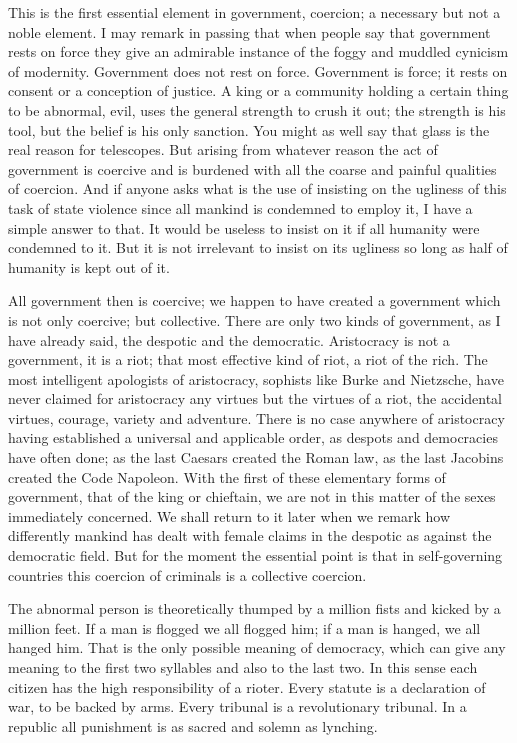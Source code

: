 \documentclass[final,10pt,letterpaper,twocolumn,openany]{book}
\begin{document}
This is the first essential element in government, coercion; a necessary
but not a noble element. I may remark in passing that when people say that
government rests on force they give an admirable instance of the foggy
and muddled cynicism of modernity. Government does not rest on force.
Government is force; it rests on consent or a conception of justice. A king
or a community holding a certain thing to be abnormal, evil, uses the
general strength to crush it out; the strength is his tool, but the belief is his
only sanction. You might as well say that glass is the real reason for
telescopes. But arising from whatever reason the act of government is
coercive and is burdened with all the coarse and painful qualities of
coercion. And if anyone asks what is the use of insisting on the ugliness of
this task of state violence since all mankind is condemned to employ it, I
have a simple answer to that. It would be useless to insist on it if all
humanity were condemned to it. But it is not irrelevant to insist on its
ugliness so long as half of humanity is kept out of it.

All government then is coercive; we happen to have created a
government which is not only coercive; but collective. There are only two
kinds of government, as I have already said, the despotic and the
democratic. Aristocracy is not a government, it is a riot; that most effective
kind of riot, a riot of the rich. The most intelligent apologists of
aristocracy, sophists like Burke and Nietzsche, have never claimed for
aristocracy any virtues but the virtues of a riot, the accidental virtues,
courage, variety and adventure. There is no case anywhere of aristocracy
having established a universal and applicable order, as despots and
democracies have often done; as the last Caesars created the Roman law,
as the last Jacobins created the Code Napoleon. With the first of these
elementary forms of government, that of the king or chieftain, we are not
in this matter of the sexes immediately concerned. We shall return to it
later when we remark how differently mankind has dealt with female
claims in the despotic as against the democratic field. But for the moment
the essential point is that in self-governing countries this coercion of
criminals is a collective coercion. 

The abnormal person is theoretically
thumped by a million fists and kicked by a million feet. If a man is flogged
we all flogged him; if a man is hanged, we all hanged him. That is the only
possible meaning of democracy, which can give any meaning to the first
two syllables and also to the last two. In this sense each citizen has the
high responsibility of a rioter. Every statute is a declaration of war, to be
backed by arms. Every tribunal is a revolutionary tribunal. In a republic all
punishment is as sacred and solemn as lynching.
\end{document}
